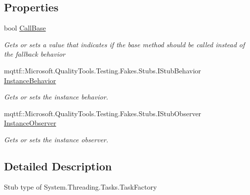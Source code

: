\subsection*{Properties}
\begin{DoxyCompactItemize}
\item 
bool \hyperlink{class_system_1_1_threading_1_1_tasks_1_1_fakes_1_1_stub_task_factory_a41accfe2ac486da10c600d2355ae9c7f}{Call\-Base}
\begin{DoxyCompactList}\small\item\em Gets or sets a value that indicates if the base method should be called instead of the fallback behavior\end{DoxyCompactList}\item 
mqttf\-::\-Microsoft.\-Quality\-Tools.\-Testing.\-Fakes.\-Stubs.\-I\-Stub\-Behavior \hyperlink{class_system_1_1_threading_1_1_tasks_1_1_fakes_1_1_stub_task_factory_a1e35e33fdd46e20be035d9a55cddb5b3}{Instance\-Behavior}
\begin{DoxyCompactList}\small\item\em Gets or sets the instance behavior.\end{DoxyCompactList}\item 
mqttf\-::\-Microsoft.\-Quality\-Tools.\-Testing.\-Fakes.\-Stubs.\-I\-Stub\-Observer \hyperlink{class_system_1_1_threading_1_1_tasks_1_1_fakes_1_1_stub_task_factory_ae2efadf1cc2ca8ee05b1f834e9100c2b}{Instance\-Observer}
\begin{DoxyCompactList}\small\item\em Gets or sets the instance observer.\end{DoxyCompactList}\end{DoxyCompactItemize}


\subsection{Detailed Description}
Stub type of System.\-Threading.\-Tasks.\-Task\-Factory



